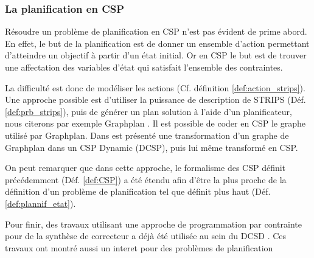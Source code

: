 \noindent
{} 

\subsubsection{La planification en CSP}
Résoudre un problème de planification en CSP n'est pas évident de prime abord. En effet, le but de la planification est de donner un ensemble d'action permettant d'atteindre un objectif à partir d'un état initial. Or en CSP le but est de trouver une affectation des variables d'état qui satisfait l'ensemble des contraintes.

La difficulté est donc de modéliser les actions (Cf. définition \ref{def:action_strips}). Une approche possible est d'utiliser la puissance de description de STRIPS (Déf. \ref{def:prb_strips}), puis de générer un plan solution à l'aide d'un planificateur, nous citerons par exemple Graphplan \cite{Blu97}. 
Il est possible de coder en CSP le graphe utilisé par Graphplan. Dans \cite{kambhampati_planning_2000} est présenté une transformation d'un graphe de Graphplan dans un CSP Dynamic (DCSP), puis lui même transformé en CSP.

On peut remarquer que dans cette approche, le formalisme des CSP définit précédemment (Déf. \ref{def:CSP}) a été étendu afin d'être la plus proche de la définition d'un problème de planification tel que définit plus haut (Déf. \ref{def:plannif_etat}). 

Pour finir, des travaux utilisant une approche de programmation par contrainte pour de la synthèse de correcteur a déjà été utilisée au sein du DCSD \cite{verfaillie}. Ces travaux ont montré aussi un interet pour des problèmes de planification

\noindent
{} 
